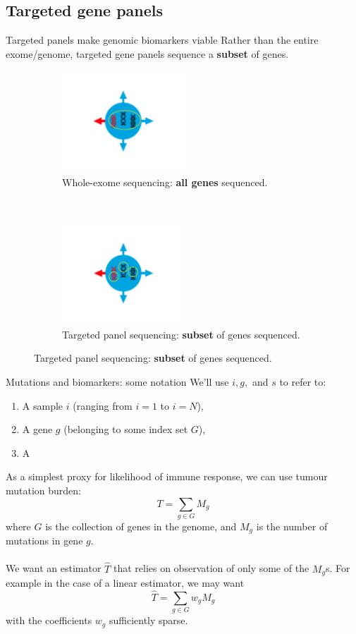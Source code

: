 \documentclass{beamer}
\begin{document}
\subsection{Targeted gene panels}

\begin{frame}{Targeted panels make genomic biomarkers viable}
Rather than the entire exome/genome, targeted gene panels sequence a \textbf{subset} of genes.

\begin{figure}[t!]
    \centering
    \begin{subfigure}[t]{0.45\textwidth}
        \centering
        \includegraphics[height=1.5in]{figures/IC5.png}
        \caption{Whole-exome sequencing: \textbf{all genes} sequenced.}
    \end{subfigure}
    ~ 
    \begin{subfigure}[t]{0.45\textwidth}
        \centering
        \includegraphics[height=1.5in]{figures/IC6.png}
        \caption{Targeted panel sequencing: \textbf{subset} of genes sequenced.}
    \end{subfigure}
\end{figure}

\end{frame}


\begin{frame}{Mutations and biomarkers: some notation}
We'll use $i,g,$ and $s$ to refer to:
\begin{enumerate}
    \item A sample $i$ (ranging from $i=1$ to $i=N$),
    \item A gene $g$ (belonging to some index set $G$),
    \item A 
\end{enumerate}
As a simplest proxy for likelihood of immune response, we can use tumour mutation burden:
\[
T = \sum_{g \in G} M_g
\]
where $G$ is the collection of genes in the genome, and $M_g$ is the number of mutations in gene $g$. \\
~\\
We want an estimator $\hat{T}$ that relies on observation of only some of the $M_g$s. For example in the case of a linear estimator, we may want 
\[\hat{T} = \sum_{g \in G} w_g M_g \]
with the coefficients $w_g$ sufficiently sparse.
\end{frame}
\end{document}
